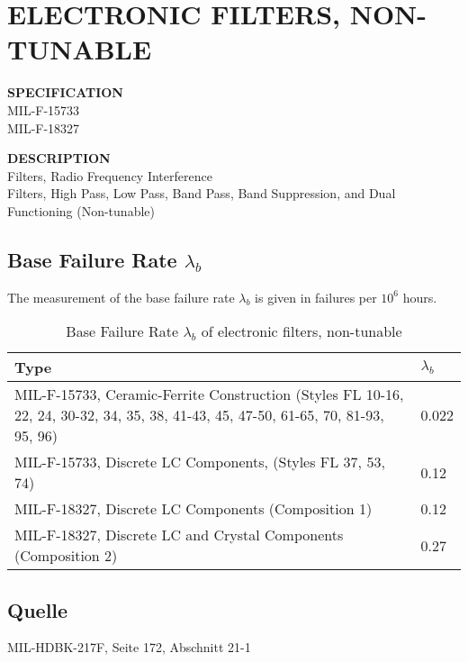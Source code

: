 \section{ELECTRONIC FILTERS, NON-TUNABLE}

\begin{minipage}[t]{0.29\textwidth}
    \textbf{SPECIFICATION}\\
    MIL-F-15733\\MIL-F-18327
\end{minipage}
\begin{minipage}[t]{0.7\textwidth}
    \textbf{DESCRIPTION}\\
    Filters, Radio Frequency Interference\\
    Filters, High Pass, Low Pass, Band Pass, Band Suppression, and Dual Functioning (Non-tunable)
\end{minipage}

\subsection{Base Failure Rate $\lambda_b$}
The measurement of the base failure rate $\lambda_b$ is given in failures per $10^6$ hours.
\begin{table}[ht]
{\centering

\begin{tabular}{|p{5cm}|p{5cm}|}
    \hline
    \textbf{Type} & \textbf{$\lambda_b$} \\
    \hline
    MIL-F-15733, Ceramic-Ferrite Construction (Styles FL 10-16, 22, 24, 30-32, 34, 35, 38, 41-43, 45, 47-50, 61-65, 70, 81-93, 95, 96) & 0.022 \\
    \hline
    MIL-F-15733, Discrete LC Components, (Styles FL 37, 53, 74) & 0.12 \\
    \hline
    MIL-F-18327, Discrete LC Components (Composition 1) & 0.12 \\
    \hline
    MIL-F-18327, Discrete LC and Crystal Components (Composition 2) & 0.27 \\
    \hline
\end{tabular}

\caption{Base Failure Rate $\lambda_b$ of electronic filters, non-tunable}

\label{tab:bfr_electronic_filters_non-tunable}
\par}
\end{table}
\subsection*{Quelle}
MIL-HDBK-217F, Seite 172, Abschnitt 21-1